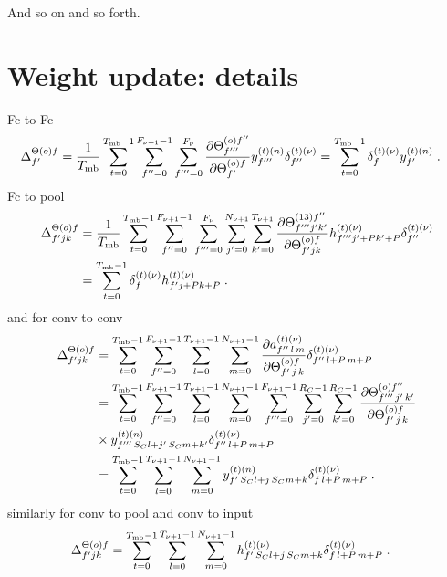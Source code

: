 \begin{subappendices}
And so on and so forth.

\section{Weight update: details}
Fc to Fc
\begin{align}
\Delta^{\Theta(o)f}_{f'}&=\frac{1}{T_{{\rm mb}}}\sum_{t=0}^{T_{{\rm mb}}-1}
%
\sum^{F_{\nu+1}-1}_{f''=0}\sum^{F_\nu}_{f'''=0}\frac{\partial\Theta^{(o)f''}_{f'''}
%
}{\partial \Theta^{(o)f}_{f'}}y^{(t)(n)}_{f'''}\delta^{(t)(\nu)}_{f''}
%
=\sum_{t=0}^{T_{{\rm mb}}-1}\delta^{(t)(\nu)}_f y^{(t)(n)}_{f'}\;.
\end{align}
Fc to pool
\begin{align}
\Delta^{\Theta(o)f}_{f'jk}&=\frac{1}{T_{{\rm mb}}}\sum_{t=0}^{T_{{\rm mb}}-1}
%
\sum^{F_{\nu+1}-1}_{f''=0}\sum^{F_\nu}_{f'''=0}\sum^{N_{\nu+1}}_{j'=0}\sum^{T_{\nu+1}}_{k'=0}
%
\frac{\partial\Theta^{(13)f''}_{f'''j'k'}
%
}{\partial \Theta^{(o)f}_{f'jk}}h^{(t)(\nu)}_{f'''j'+Pk'+P}\delta^{(t)(\nu)}_{f''}\notag\\
%
&=\sum_{t=0}^{T_{{\rm mb}}-1}\delta^{(t)(\nu)}_f h^{(t)(\nu)}_{f'j+Pk+P}\;.
\end{align}
and for conv to conv
\begin{align}
\Delta^{\Theta(o)f}_{f'jk}&=\sum_{t=0}^{T_{{\rm mb}}-1}\sum^{F_{\nu+1}-1}_{f''=0}\sum^{T_{\nu+1}-1}_{l=0}\sum^{N_{\nu+1}-1}_{m=0}
%
\frac{\partial a_{f''\,l\,m}^{(t)(\nu)}}{\partial \Theta^{(o)f}_{f'\,j\,k}}
%
\delta_{f''\,l+P\,m+P}^{(t)(\nu)}\notag\\
%
&=\sum_{t=0}^{T_{{\rm mb}}-1}\sum^{F_{\nu+1}-1}_{f''=0}\sum^{T_{\nu+1}-1}_{l=0}\sum^{N_{\nu+1}-1}_{m=0}
%
\sum^{F_{\nu+1}-1}_{f'''=0}\sum^{R_C-1}_{j'=0}\sum^{R_C-1}_{k'=0}
%
\frac{\partial \Theta^{(o)f''}_{f'''\,j'\,k'}}{\partial \Theta^{(o)f}_{f'\,j\,k}}\notag\\
%
&\times y^{(t)(n)}_{f'''\,S_Cl+j'\,S_Cm+k'}
%
\delta_{f''\,l+P\,m+P}^{(t)(\nu)}\notag\\
%
&=\sum_{t=0}^{T_{{\rm mb}}-1}\sum^{T_{\nu+1}-1}_{l=0}\sum^{N_{\nu+1}-1}_{m=0}
%
y^{(t)(n)}_{f'\,S_Cl+j\,S_Cm+k}\delta_{f\,l+P\,m+P}^{(t)(\nu)}\;.
\end{align}
similarly for conv to pool and conv to input
\begin{align}
\Delta^{\Theta(o)f}_{f'jk}&=\sum_{t=0}^{T_{{\rm mb}}-1}\sum^{T_{\nu+1}-1}_{l=0}\sum^{N_{\nu+1}-1}_{m=0}
%
h^{(t)(\nu)}_{f'\,S_Cl+j\,S_Cm+k}\delta_{f\,l+P\,m+P}^{(t)(\nu)}\;.
\end{align}
%
%

\end{subappendices}
